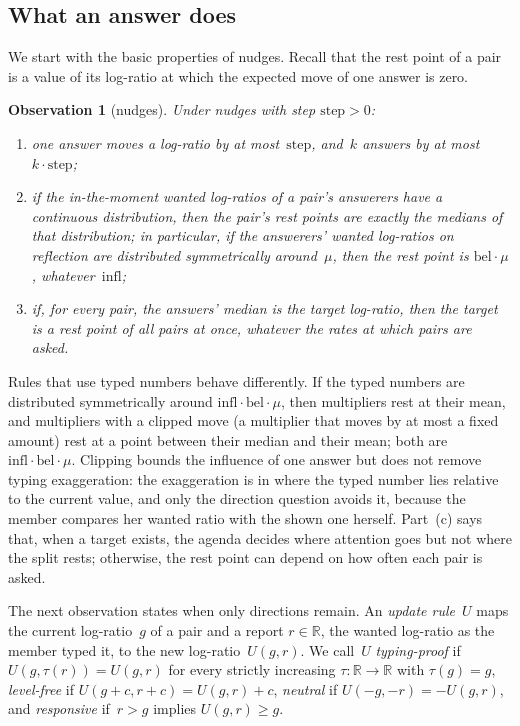 \documentclass[doubleblind]{ecai}
\newtheorem{observation}[theorem]{Observation}
\theoremstyle{remark}
\newcommand{\step}{\mathrm{step}}
\newcommand{\bel}{\mathrm{bel}}
\newcommand{\infl}{\mathrm{infl}}
\begin{document}
\subsection{What an answer does}\label{sec:what}

We start with the basic properties of nudges. Recall that the rest point of a pair is a value of its log-ratio at which the expected move of one answer is zero.

\begin{observation}[nudges]\label{obs:nudge}
Under nudges with step $\step > 0$:
\begin{enumerate}[leftmargin=*,nosep,label=(\alph*)]
\item one answer moves a log-ratio by at most~$\step$, and~$k$ answers by at most $k\cdot\step$;
\item if the in-the-moment wanted log-ratios of a pair's answerers have a continuous distribution, then the pair's rest points are exactly the medians of that distribution; in particular, if the answerers' wanted log-ratios on reflection are distributed symmetrically around~$\mu$, then the rest point is $\bel\cdot\mu$, whatever~$\infl$;
\item if, for every pair, the answers' median is the target log-ratio, then the target is a rest point of all pairs at once, whatever the rates at which pairs are asked.
\end{enumerate}
\end{observation}

Rules that use typed numbers behave differently. If the typed numbers are distributed symmetrically around $\infl\cdot\bel\cdot\mu$, then multipliers rest at their mean, and multipliers with a clipped move (a multiplier that moves by at most a fixed amount) rest at a point between their median and their mean; both are $\infl\cdot\bel\cdot\mu$. Clipping bounds the influence of one answer but does not remove typing exaggeration: the exaggeration is in where the typed number lies relative to the current value, and only the direction question avoids it, because the member compares her wanted ratio with the shown one herself. Part~(c) says that, when a target exists, the agenda decides where attention goes but not where the split rests; otherwise, the rest point can depend on how often each pair is asked.

The next observation states when only directions remain. An \emph{update rule}~$U$ maps the current log-ratio~$g$ of a pair and a report $r\in\mathbb{R}$, the wanted log-ratio as the member typed it, to the new log-ratio~$U(g,r)$. We call~$U$ \emph{typing-proof} if $U(g,\tau(r)) = U(g,r)$ for every strictly increasing $\tau:\mathbb{R}\to\mathbb{R}$ with $\tau(g) = g$, \emph{level-free} if $U(g+c, r+c) = U(g,r)+c$, \emph{neutral} if $U(-g,-r) = -U(g,r)$, and \emph{responsive} if~$r > g$ implies $U(g,r) \ge g$.
\end{document}
